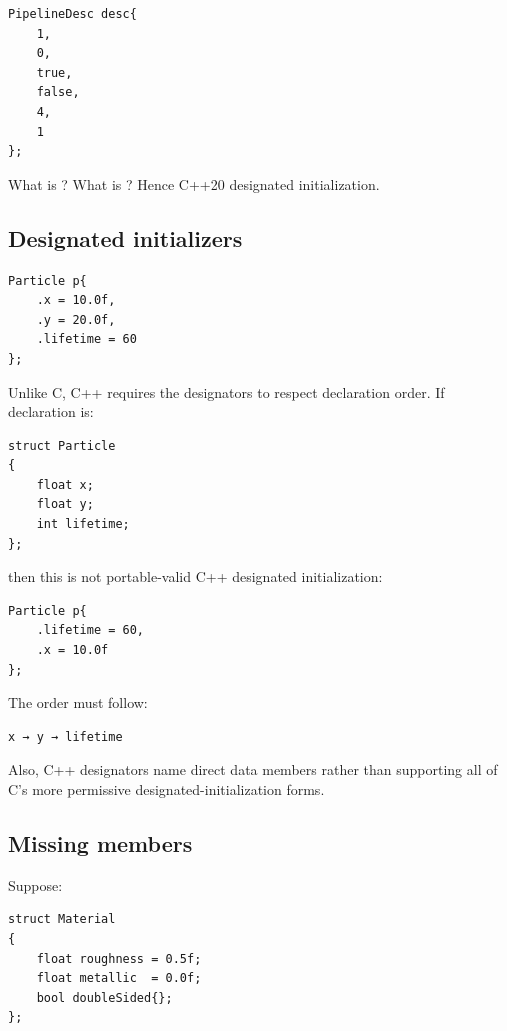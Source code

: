 \begin{verbatim}
PipelineDesc desc{
    1,
    0,
    true,
    false,
    4,
    1
};
\end{verbatim}

What is ? What is ? Hence C++20 designated initialization.

\subsection{Designated initializers}\label{05-engine-i-ch003-designated-initializers}

\hypertarget{05-engine-i-ch003-designated-initializers}{}

\begin{verbatim}
Particle p{
    .x = 10.0f,
    .y = 20.0f,
    .lifetime = 60
};
\end{verbatim}

Unlike C, C++ requires the designators to respect declaration order. If declaration is:

\begin{verbatim}
struct Particle
{
    float x;
    float y;
    int lifetime;
};
\end{verbatim}

then this is not portable-valid C++ designated initialization:

\begin{verbatim}
Particle p{
    .lifetime = 60,
    .x = 10.0f
};
\end{verbatim}

The order must follow:

\begin{verbatim}
x → y → lifetime
\end{verbatim}

Also, C++ designators name direct data members rather than supporting all of C's more permissive designated-initialization forms.

\subsection{Missing members}\label{05-engine-i-ch003-missing-members}

\hypertarget{05-engine-i-ch003-missing-members}{}

Suppose:

\begin{verbatim}
struct Material
{
    float roughness = 0.5f;
    float metallic  = 0.0f;
    bool doubleSided{};
};
\end{verbatim}

